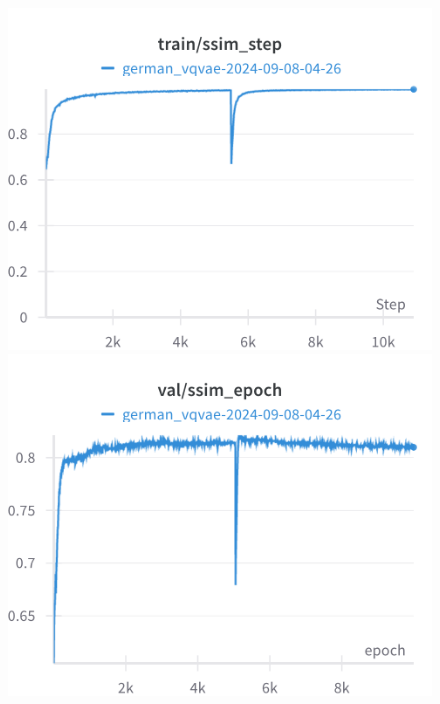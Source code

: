 \begin{figure}[H]
\includegraphics[width=\linewidth]{detailed_engineering/German VQVAE/charts/train_ssim_step.png}
\caption{}
\endminipage\hfill
{}
\includegraphics[width=\linewidth]{detailed_engineering/German VQVAE/charts/val_ssim_epoch.png}
\caption{}
\endminipage
\end{figure}

